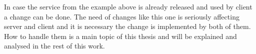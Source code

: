 In case the service from the example above is already released and used by client a change can be done. The need of changes like this one is seriously affecting server and client and it is necessary the change is implemented by both of them. How to handle them is a main topic of this thesis and will be explained and analysed in the rest of this work.


